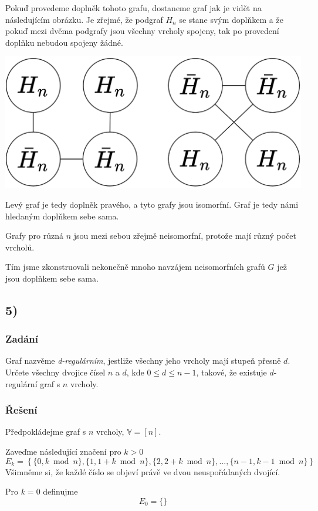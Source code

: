 \documentclass[../main.tex]{subfiles}
\begin{document}
Pokuď provedeme doplněk tohoto grafu, dostaneme graf jak je vidět na následujícím obrázku. Je zřejmé, že podgraf $H_n$ se stane svým doplňkem a že pokuď mezi dvěma podgrafy jsou všechny vrcholy spojeny, tak po provedení doplňku nebudou spojeny žádné.

\begin{center}
    \centering
    \includegraphics*[width=0.5\linewidth]{images/hw1-4.png}
\end{center}

Levý graf je tedy doplněk pravého, a tyto grafy jsou isomorfní. Graf je tedy námi hledaným doplňkem sebe sama. 

Grafy pro různá $n$ jsou mezi sebou zřejmě neisomorfní, protože mají různý počet vrcholů. 

Tím jsme zkonstruovali nekonečně mnoho navzájem neisomorfních grafů $G$ jež jsou doplňkem sebe sama.




\subsection*{5)}
\subsubsection*{Zadání}
Graf nazvěme \textit{d-regulárním}, jestliže všechny jeho vrcholy mají stupeň přesně $d$. 
Určete všechny dvojice čísel $n$ a $d$, kde $0\leq d\leq n-1$, takové, že existuje $d$-regulární graf s $n$ vrcholy.
\subsubsection*{Řešení}
Předpokládejme graf s $n$ vrcholy, $\mathbb{V} = [n]$.

Zaveďme následující značení pro $k>0$
\begin{equation*}
    E_k = \left\{ \{ 0, k\bmod n \}, \{ 1, 1 + k\bmod n \}, \{ 2, 2+k\bmod n \}, ..., \{ n - 1, k - 1\bmod n \}\right\}
\end{equation*}
Všimněme si, že každé číslo se objeví právě ve dvou neuspořádaných dvojící.

Pro $k=0$ definujme
\begin{equation*}
    E_0 = \{\}
\end{equation*}
\end{document}
